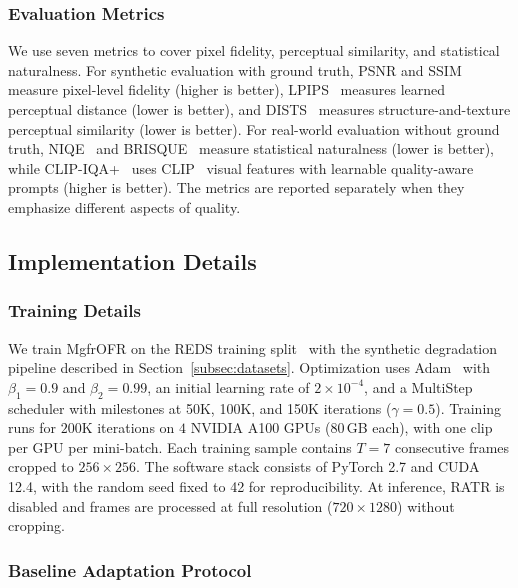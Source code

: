 \documentclass[symmetry,article,submit,pdftex,moreauthors]{Definitions/mdpi}
\begin{document}
\subsubsection{Evaluation Metrics}
\label{subsec:eval_metrics}

We use seven metrics to cover pixel fidelity, perceptual similarity, and statistical naturalness. For synthetic evaluation with ground truth, PSNR and SSIM~\cite{wang2004ssim} measure pixel-level fidelity (higher is better), LPIPS~\cite{zhang2018lpips} measures learned perceptual distance (lower is better), and DISTS~\cite{ding2020dists} measures structure-and-texture perceptual similarity (lower is better). For real-world evaluation without ground truth, NIQE~\cite{mittal2012niqe} and BRISQUE~\cite{mittal2012brisque} measure statistical naturalness (lower is better), while CLIP-IQA+~\cite{wang2023clipiqa} uses CLIP~\cite{radford2021clip} visual features with learnable quality-aware prompts (higher is better). The metrics are reported separately when they emphasize different aspects of quality.

\subsection{Implementation Details}
\label{subsec:implementation}

\subsubsection{Training Details}
\label{subsubsec:training_details}

We train MgfrOFR on the REDS training split~\cite{nah2019reds} with the synthetic degradation pipeline described in Section~\ref{subsec:datasets}. Optimization uses Adam~\cite{kingma2015adam} with $\beta_1=0.9$ and $\beta_2=0.99$, an initial learning rate of $2\times10^{-4}$, and a MultiStep scheduler with milestones at 50K, 100K, and 150K iterations ($\gamma=0.5$). Training runs for $200$K iterations on $4$ NVIDIA A100 GPUs (80\,GB each), with one clip per GPU per mini-batch. Each training sample contains $T=7$ consecutive frames cropped to $256\times256$. The software stack consists of PyTorch 2.7 and CUDA 12.4, with the random seed fixed to 42 for reproducibility. At inference, RATR is disabled and frames are processed at full resolution ($720 \times 1280$) without cropping.

\subsubsection{Baseline Adaptation Protocol}
\label{subsubsec:baseline_adaptation}
\end{document}
